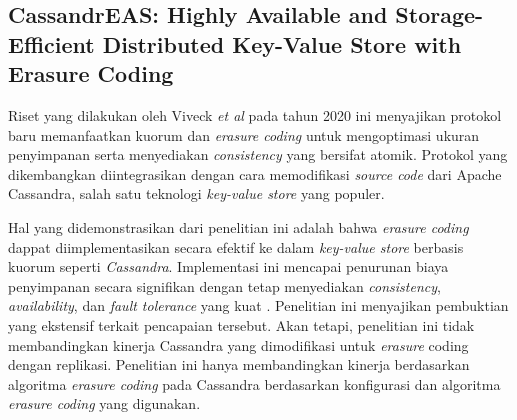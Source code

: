 \subsection{CassandrEAS: Highly Available and Storage-Efficient Distributed Key-Value Store with Erasure Coding}

Riset yang dilakukan oleh Viveck \textit{et al} pada tahun 2020 ini menyajikan protokol baru memanfaatkan kuorum dan \textit{erasure coding} untuk mengoptimasi ukuran penyimpanan serta menyediakan \textit{consistency} yang bersifat atomik. Protokol yang dikembangkan diintegrasikan dengan cara memodifikasi \textit{source code} dari Apache Cassandra, salah satu teknologi \textit{key-value store} yang populer.

Hal yang didemonstrasikan dari penelitian ini adalah bahwa \textit{erasure coding} dappat diimplementasikan secara efektif ke dalam \textit{key-value store} berbasis kuorum seperti \textit{Cassandra}. Implementasi ini mencapai penurunan biaya penyimpanan secara signifikan dengan tetap menyediakan \textit{consistency}, \textit{availability}, dan \textit{fault tolerance} yang kuat \parencite{yiu2017erasure}. Penelitian ini menyajikan pembuktian yang ekstensif terkait pencapaian tersebut. Akan tetapi, penelitian ini tidak membandingkan kinerja Cassandra yang dimodifikasi untuk \textit{erasure} coding dengan replikasi. Penelitian ini hanya membandingkan kinerja berdasarkan algoritma \textit{erasure coding} pada Cassandra berdasarkan konfigurasi dan algoritma \textit{erasure coding} yang digunakan.
